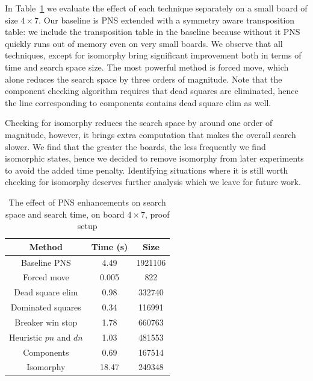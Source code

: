 \documentclass[conference]{IEEEtran}
\theoremstyle{definition}
\newcommand{\pn}{$pn$\xspace}
\newcommand{\dn}{$dn$\xspace}
\begin{document}
In Table~\ref{tab:all_technique} we evaluate the effect of each technique separately on a small board of size $4 \times 7$. Our baseline is PNS extended with a symmetry aware transposition table: we include the transposition table in the baseline because without it PNS quickly runs out of memory even on very small boards. We observe that all techniques, except for isomorphy bring significant improvement both in terms of time and search space size. The most powerful method is forced move, which alone reduces the search space by three orders of magnitude. Note that the component checking algorithm requires that dead squares are eliminated, hence the line corresponding to components contains dead square elim as well.

Checking for isomorphy reduces the search space by around one order of magnitude, however, it brings extra computation that makes the overall search slower. We find that the greater the boards, the less frequently we find isomorphic states, hence we decided to remove isomorphy from later experiments to avoid the added time penalty. Identifying situations where it is still worth checking for isomorphy deserves further analysis which we leave for future work. 



\begin{table}[htbp]
\caption{The effect of PNS enhancements on search space and search time, on board $4\times 7$, proof setup}
\begin{center}
\begin{tabular}{ c | c c }
Method & \textbf{Time (s)} & \textbf{Size} \\
\hline 
Baseline PNS & 4.49 & 1921106  \\
Forced move & 0.005 & 822  \\
Dead square elim & 0.98 & 332740  \\
Dominated squares & 0.34 & 116991  \\
Breaker win stop & 1.78 & 660763  \\
Heuristic \pn and \dn & 1.03 & 481553  \\
Components & 0.69 & 167514  \\
Isomorphy & 18.47 & 249348  \\
\hline
\end{tabular}
\label{tab:all_technique}
\end{center}
\end{table}
\end{document}
